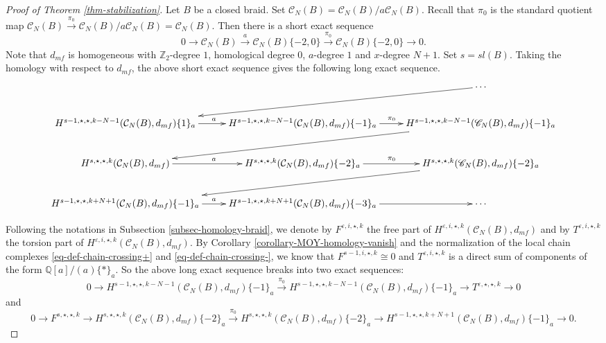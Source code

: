 \documentclass{amsart}
\theoremstyle{plain}
\theoremstyle{definition}
\theoremstyle{remark}
\numberwithin{equation}{section}
\begin{document}
\begin{proof}[Proof of Theorem \ref{thm-stabilization}]
Let $B$ be a closed braid. Set $\mathscr{C}_N(B) = {\mathcal{C}}_N(B)/a{\mathcal{C}}_N(B)$. Recall that $\pi_0$ is the standard quotient map ${\mathcal{C}}_N(B) \xrightarrow{\pi_0} {\mathcal{C}}_N(B)/a{\mathcal{C}}_N(B) = \mathscr{C}_N(B)$. Then there is a short exact sequence
\[
0 \rightarrow {\mathcal{C}}_N(B) \xrightarrow{a} {\mathcal{C}}_N(B)\{-2,0\} \xrightarrow{\pi_0} \mathscr{C}_N(B) \{-2,0\} \rightarrow 0.
\]
Note that $d_{mf}$ is homogeneous with ${\mathbb{Z}}_2$-degree $1$, homological degree $0$, $a$-degree $1$ and $x$-degree $N+1$. Set $s=sl(B)$. Taking the homology with respect to $d_{mf}$, the above short exact sequence gives the following long exact sequence.
{\small
\[
\xymatrix{
&& \cdots\ar[lld]  \\
H^{s-1,\star,\star,k-N-1}({\mathcal{C}}_N(B), d_{mf})\{1\}_a \ar[r]^a & H^{s-1,\star,\star,k-N-1}({\mathcal{C}}_N(B), d_{mf})\{-1\}_a \ar[r]^{\pi_0} & H^{s-1,\star,\star,k-N-1}(\mathscr{C}_N(B), d_{mf})\{-1\}_a \ar[lld] \\
H^{s,\star,\star,k}({\mathcal{C}}_N(B), d_{mf})\ar[r]^a & H^{s,\star,\star,k}({\mathcal{C}}_N(B), d_{mf})\{-2\}_a \ar[r]^{\pi_0} & H^{s,\star,\star,k}(\mathscr{C}_N(B), d_{mf})\{-2\}_a \ar[lld] \\
H^{s-1,\star,\star,k+N+1}({\mathcal{C}}_N(B), d_{mf})\{-1\}_a \ar[r]^a & H^{s-1,\star,\star,k+N+1}({\mathcal{C}}_N(B), d_{mf})\{-3\}_a \ar[r] & \cdots
}
\]
}

Following the notations in Subsection \ref{subsec-homology-braid}, we denote by $F^{{\varepsilon},i,\star,k}$ the free part of $H^{{\varepsilon},i,\star,k}({\mathcal{C}}_N(B),d_{mf})$ and by $T^{{\varepsilon},i,\star,k}$ the torsion part of $H^{{\varepsilon},i,\star,k}({\mathcal{C}}_N(B),d_{mf})$. By Corollary \ref{corollary-MOY-homology-vanish} and the normalization of the local chain complexes \eqref{eq-def-chain-crossing+} and \eqref{eq-def-chain-crossing-}, we know that $F^{s-1,i,\star,k} \cong 0$ and $T^{{\varepsilon},i,\star,k}$ is a direct sum of components of the form ${\mathbb{Q}}[a]/(a)\{\ast\}_a$. So the above long exact sequence breaks into two exact sequences:
\begin{equation}\label{eq-exact-seq-s-1}
0\rightarrow H^{s-1,\star,\star,k-N-1}({\mathcal{C}}_N(B), d_{mf})\{-1\}_a \xrightarrow{\pi_0} H^{s-1,\star,\star,k-N-1}(\mathscr{C}_N(B), d_{mf})\{-1\}_a \rightarrow T^{{\varepsilon},\star,\star,k} \rightarrow 0
\end{equation}
and 
{\small
\begin{equation}\label{eq-exact-seq-s}
0\rightarrow F^{s,\star,\star,k} \rightarrow H^{s,\star,\star,k}({\mathcal{C}}_N(B), d_{mf})\{-2\}_a \xrightarrow{\pi_0} H^{s,\star,\star,k}(\mathscr{C}_N(B), d_{mf})\{-2\}_a \rightarrow H^{s-1,\star,\star,k+N+1}({\mathcal{C}}_N(B), d_{mf})\{-1\}_a \rightarrow 0.
\end{equation}
}


\end{proof}
\end{document}
